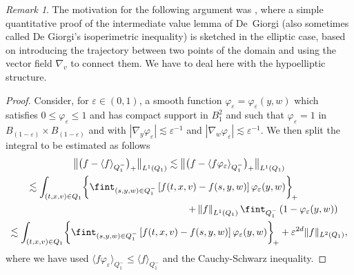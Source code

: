 \documentclass[JEP,XML,SOM,Unicode,NoFloatCountersInSection,published]{cedram}
\newcommand{\bnorm}[1]{\bigl\| #1 \bigr\|}
\newcommand{\nnorm}[1]{\| #1\|}
\theoremstyle{definition}
\theoremstyle{remark}
\newtheorem{remark}[theorem]{Remark}
\newcommand{\norm}[1]{\left\| #1 \right\|}
\let\var\varepsilon
\begin{document}
\begin{remark}
The motivation for the following argument was \cite[Lem.\,10,
p.\,11]{vasseur}, where a simple quantitative proof of the
intermediate value lemma of De~Giorgi (also sometimes called De
Giorgi's isoperimetric inequality) is sketched in the elliptic
case, based on introducing the trajectory between two points of
the domain and using the vector field $\nabla_v$ to connect
them. We have to deal here with the hypoelliptic structure.
\end{remark}

\begin{proof}
Consider, for $\var \in (0,1)$, a smooth function
$\varphi_\var=\varphi_\var(y,w)$ which satisfies
$0\leq \varphi_\var \leq 1$ and has compact support in
$B_1^{2}$ and such that $\varphi_\var=1$ in
$B_{(1-\var)}\times B_{(1-\var)}$ and with
$|\nabla_y \varphi_\var|\lesssim \var^{-1}$ and
$|\nabla_w \varphi_\var|\lesssim \var^{-1}$. We then split the
integral to be estimated as follows
\begin{multline*}
\bnorm{\bigl(f-\langle f
\rangle_{Q_1^{-}}\bigr)_+}_{L^{1}(Q_1)} \lesssim
\bnorm{\bigl(f-\langle f \varphi_\var
\rangle_{Q_1^{-}} \bigr)_+}_{L^{1}(Q_1)}\\
\hspace*{-1.13cm}\lesssim
\int_{(t,x,v) \in Q_1}
\biggl\{ \fint_{(s,y,w) \in Q_1^-} \left[
f(t,x,v)-f(s,y,w) \right] \varphi_\var(y,
w) \biggr\}_{\!+} \\
\shoveright{+ \norm{f}_{L^1(Q_1)}
\fint_{Q_{1}^{-}}\left( 1 - \varphi_\var(y,w) \right)}\\
\lesssim \int_{(t,x,v) \in Q_1}
\biggl\{ \fint_{(s,y,w) \in Q_1^-} \left[
f(t,x,v)-f(s,y,w) \right] \varphi_\var(y,
w) \biggr\}_{\!+} + \var^{2d} \nnorm{f}_{L^2(Q_1)},
\end{multline*}
where we have used
$\langle f \varphi_\var \rangle_{Q_1^{-}}\leq \langle f
\rangle_{Q_1^{-}}$ and the Cauchy-Schwarz inequality.


\end{proof}
\end{document}
